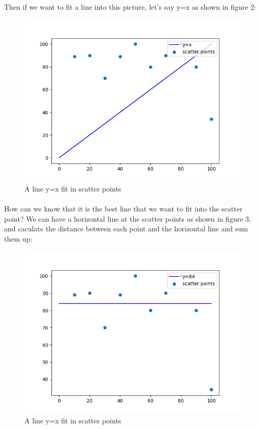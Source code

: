 \documentclass[a4paper,12pt]{article}
\begin{document}
\begin{spacing}{2}
\paragraph{}Then if we want to fit a line into this picture, let's say y=x as shown in figure 2:
\begin{figure}[h]
\centering
\includegraphics[scale=0.5]{Figure_2.png}
\caption{A line y=x fit in scatter points}
\label{fitting line}
\end{figure}


 \paragraph{ } How can we know that it is the best line that we want to fit into the scatter point? We can have a horizontal line at the scatter points as shown in figure 3, and caculate the distance between each point and the horizontal line and sum them up:
\begin{figure}[h]
\centering
\includegraphics[scale=0.5]{Figure_3.png}
\caption{A line y=x fit in scatter points}
\label{horizontal line}
\end{figure}

\end{spacing}
\end{document}
